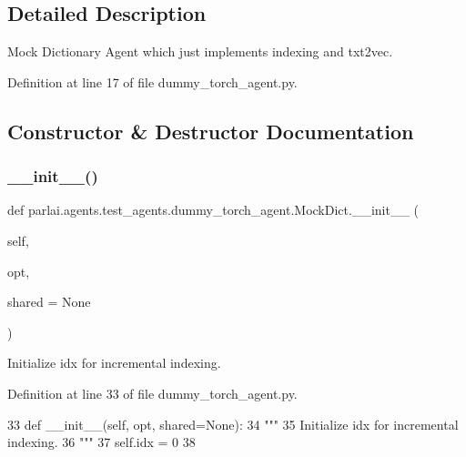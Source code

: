 \subsection{Detailed Description}
\begin{DoxyVerb}Mock Dictionary Agent which just implements indexing and txt2vec.
\end{DoxyVerb}
 

Definition at line 17 of file dummy\+\_\+torch\+\_\+agent.\+py.



\subsection{Constructor \& Destructor Documentation}
\mbox{\label{classparlai_1_1agents_1_1test__agents_1_1dummy__torch__agent_1_1MockDict_ac1430e2d948a25733e5302222479a351}} 
\subsubsection{\texorpdfstring{\+\_\+\+\_\+init\+\_\+\+\_\+()}{\_\_init\_\_()}}
{\footnotesize\ttfamily def parlai.\+agents.\+test\+\_\+agents.\+dummy\+\_\+torch\+\_\+agent.\+Mock\+Dict.\+\_\+\+\_\+init\+\_\+\+\_\+ (\begin{DoxyParamCaption}\item[{}]{self,  }\item[{}]{opt,  }\item[{}]{shared = {\ttfamily None} }\end{DoxyParamCaption})}

\begin{DoxyVerb}Initialize idx for incremental indexing.
\end{DoxyVerb}
 

Definition at line 33 of file dummy\+\_\+torch\+\_\+agent.\+py.


\begin{DoxyCode}
33     \textcolor{keyword}{def }\_\_init\_\_(self, opt, shared=None):
34         \textcolor{stringliteral}{"""}
35 \textcolor{stringliteral}{        Initialize idx for incremental indexing.}
36 \textcolor{stringliteral}{        """}
37         self.idx = 0
38 
\end{DoxyCode}


